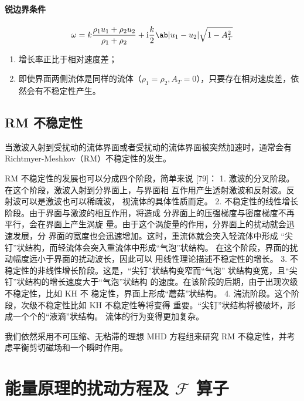 \paragraph{锐边界条件}

\begin{equation}
\omega = k \frac{\rho_1 u_1 + \rho_2 u_2}{\rho_1 + \rho_2}
+ \im \frac{k}{2} \ab|u_1 - u_2| \sqrt{1 - A_T^2}
\end{equation}

\begin{enumerate}
    \item 增长率正比于相对速度差；
    \item 即使界面两侧流体是同样的流体（$\rho_1 = \rho_2, A_T = 0$），只要存在相对速度差，依然会有不稳定性产生。
\end{enumerate}

\subsection{RM 不稳定性}

当激波入射到受扰动的流体界面或者受扰动的流体界面被突然加速时，通常会有 Richtmyer-Meshkov（RM）不稳定性的发生。

RM 不稳定性的发展也可以分成四个阶段，简单来说 [79]：
1. 激波的分叉阶段。在这个阶段，激波入射到分界面上，与界面相
互作用产生透射激波和反射波。反射波可以是激波也可以稀疏波，
视流体的具体性质而定。
2. 不稳定性的线性增长阶段。由于界面与激波的相互作用，将造成
分界面上的压强梯度与密度梯度不再平行，会在界面上产生涡旋
量。由于这个涡旋量的作用，分界面上的扰动就会迅速发展，分
界面的宽度也会迅速增加。这时，重流体就会突入轻流体中形成
“尖钉”状结构，而轻流体会突入重流体中形成“气泡”状结构。
在这个阶段，界面的扰动幅度远小于界面的扰动波长，因此可以
用线性理论描述不稳定性的增长。
3. 不稳定性的非线性增长阶段。这是，“尖钉”状结构变窄而“气泡”
状结构变宽，且“尖钉”状结构的增长速度大于“气泡”状结构
的速度。在该阶段的后期，由于出现次级不稳定性，比如 KH 不
稳定性，界面上形成“蘑菇”状结构。
4. 湍流阶段。这个阶段，次级不稳定性比如 KH 不稳定性等将变得
重要。“尖钉”状结构将被破坏，形成一个个的“液滴”状结构。
流体的行为变得更加复杂。

我们依然采用不可压缩、无粘滞的理想 MHD 方程组来研究 RM 不稳定性，并考虑平衡剪切磁场和一个瞬时作用。

\section{能量原理的扰动方程及 \texorpdfstring{$\mathscr{F}$}{F} 算子}

